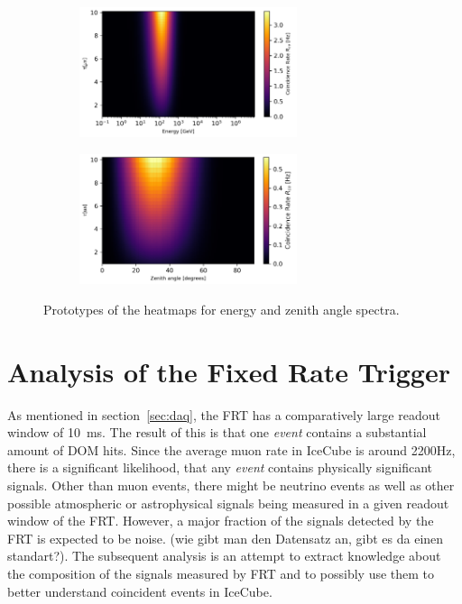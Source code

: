 \begin{figure}[ht]
    \centering
    \begin{subfigure}[b]{\textwidth}
        \centering
        \includegraphics[width=0.7\textwidth]{Plots/heatmap_energy.png}
    \end{subfigure}
    \vspace{1em} %
    \begin{subfigure}[b]{\textwidth}
        \centering
        \includegraphics[width=0.7\textwidth]{Plots/heatmap_zenith.png}
    \end{subfigure}
    \caption{Prototypes of the heatmaps for energy and zenith angle spectra.}
    \label{fig:heatmaps_combined}
\end{figure}

\section{Analysis of the Fixed Rate Trigger}

As mentioned in section~\ref{sec:daq}, the FRT has a comparatively large readout window of \SI{10}{ms}. The result of this is that one \textit{event} contains 
a substantial amount of DOM hits. Since the average muon rate in IceCube is around \num{2200}\unit{Hz}, there is a significant likelihood, that any \textit{event}
contains physically significant signals. Other than muon events, there might be neutrino events as well as other possible atmospheric or astrophysical signals 
being measured in a given readout window of the FRT. However, a major fraction of the signals detected by the FRT is expected to be noise. 
(wie gibt man den Datensatz an, gibt es da einen standart?). The subsequent analysis is an attempt to extract knowledge about the composition of the signals 
measured by FRT and to possibly use them to better understand coincident events in IceCube.\\

